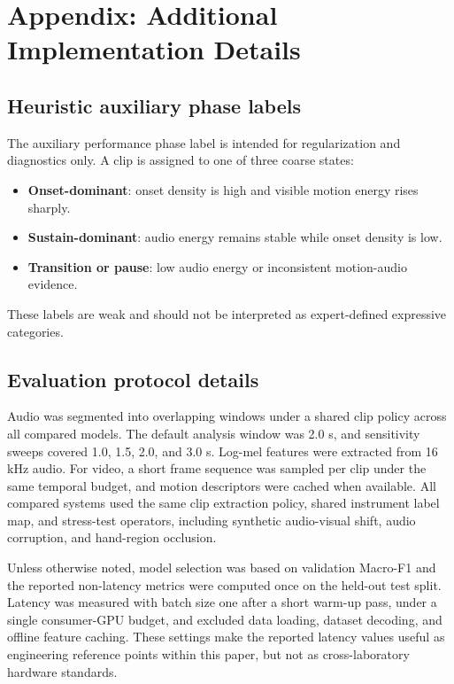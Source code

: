 \section{Appendix: Additional Implementation Details}
\label{sec:appendix}

\subsection{Heuristic auxiliary phase labels}

The auxiliary performance phase label is intended for regularization and diagnostics only. A clip is assigned to one of three coarse states:
\begin{itemize}[leftmargin=*]
    \item \textbf{Onset-dominant}: onset density is high and visible motion energy rises sharply.
    \item \textbf{Sustain-dominant}: audio energy remains stable while onset density is low.
    \item \textbf{Transition or pause}: low audio energy or inconsistent motion-audio evidence.
\end{itemize}
These labels are weak and should not be interpreted as expert-defined expressive categories.

\subsection{Evaluation protocol details}

Audio was segmented into overlapping windows under a shared clip policy across all compared models. The default analysis window was 2.0 s, and sensitivity sweeps covered 1.0, 1.5, 2.0, and 3.0 s. Log-mel features were extracted from 16 kHz audio. For video, a short frame sequence was sampled per clip under the same temporal budget, and motion descriptors were cached when available. All compared systems used the same clip extraction policy, shared instrument label map, and stress-test operators, including synthetic audio-visual shift, audio corruption, and hand-region occlusion.

Unless otherwise noted, model selection was based on validation Macro-F1 and the reported non-latency metrics were computed once on the held-out test split. Latency was measured with batch size one after a short warm-up pass, under a single consumer-GPU budget, and excluded data loading, dataset decoding, and offline feature caching. These settings make the reported latency values useful as engineering reference points within this paper, but not as cross-laboratory hardware standards.

